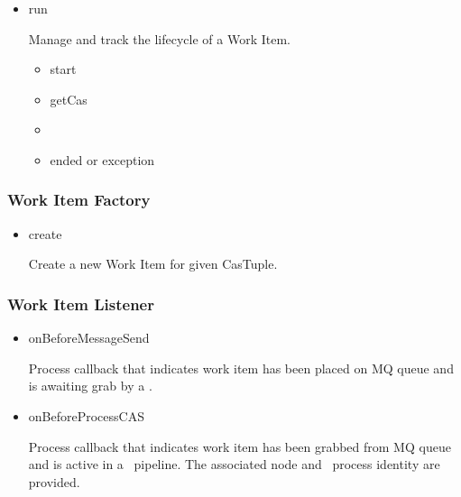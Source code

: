 \begin{itemize}
    \begin{itemize}
    
      \item run
      
      Manage and track the lifecycle of a Work Item.
      
      \begin{itemize}
        \item start
        \item getCas
        \item \varSendAndReceiveCAS
        \item ended or exception
      \end{itemize}    
      
    \end{itemize}    
     
    \subsubsection{Work Item Factory}
    
    \begin{itemize}
    
      \item create
      
      Create a new Work Item for given CasTuple.
      
    \end{itemize}  
          
    \subsubsection{Work Item Listener}
    
    \begin{itemize}
    
      \item onBeforeMessageSend
      
      Process callback that indicates work item has been placed on MQ queue and
      is awaiting grab by a \varJP.
      
      \item onBeforeProcessCAS
            
      Process callback that indicates work item has been grabbed from MQ queue and
      is active in a \varUIMA~pipeline.
      The associated node and \varLinux~process identity are provided.
      
    \end{itemize}
    

\end{itemize}
